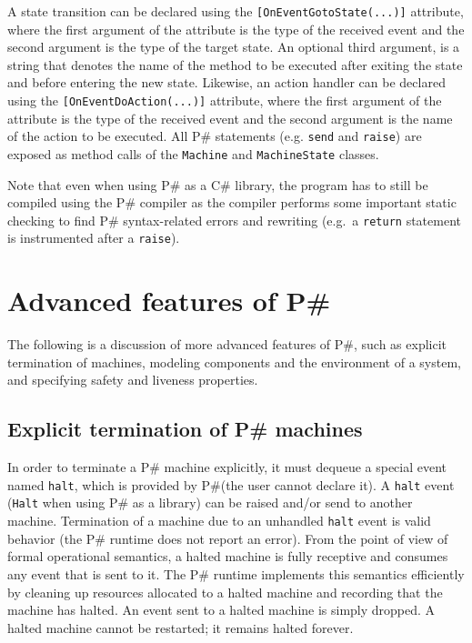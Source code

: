 \documentclass{llncs}
\newcommand{\ps}{P\#\xspace}
\newcommand{\cs}{C\#\xspace}
\begin{document}
A state transition can be declared using the \texttt{[OnEventGotoState(...)]} attribute, where the first argument of the attribute is the type of the received event and the second argument is the type of the target state. An optional third argument, is a string that denotes the name of the method to be executed after exiting the state and before entering the new state. Likewise, an action handler can be declared using the \texttt{[OnEventDoAction(...)]} attribute, where the first argument of the attribute is the type of the received event and the second argument is the name of the action to be executed. All \ps statements (e.g. \texttt{send} and \texttt{raise}) are exposed as method calls of the \texttt{Machine} and \texttt{MachineState} classes.

Note that even when using \ps as a \cs library, the program has to still be compiled using the \ps compiler as the compiler performs some important static checking to find \ps syntax-related errors and rewriting (e.g.\ a \texttt{return} statement is instrumented after a \texttt{raise}).

\section{Advanced features of \ps}
\label{sec:advanced}

The following is a discussion of more advanced features of \ps, such as explicit termination of machines, modeling components and the environment of a system, and specifying safety and liveness properties.

\subsection{Explicit termination of \ps machines}
\label{sec:termination}

In order to terminate a \ps machine explicitly, it must dequeue a special event named \texttt{halt}, which is provided by \ps (the user cannot declare it). A \texttt{halt} event (\texttt{Halt} when using \ps as a library) can be raised and/or send to another machine. Termination of a machine due to an unhandled \texttt{halt} event is valid behavior (the \ps runtime does not report an error). From the point of view of formal operational semantics, a halted machine is fully receptive and consumes any event that is sent to it. The \ps runtime implements this semantics efficiently by cleaning up resources allocated to a halted machine and recording that the machine has halted. An event sent to a halted machine is simply dropped. A halted machine cannot be restarted; it remains halted forever.
\end{document}
